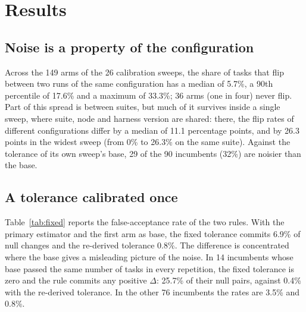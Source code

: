 
\section{Results}\label{sec:results}

\subsection{Noise is a property of the configuration}\label{sec:res-heterogeneity}
Across the 149 arms of the 26 calibration sweeps, the share of tasks that flip
between two runs of the same configuration has a median of 5.7\%, a 90th
percentile of 17.6\% and a maximum of 33.3\%; 36 arms (one in four) never flip. Part of
this spread is between suites, but much of it survives inside a single sweep,
where suite, node and harness version are shared: there, the flip rates of
different configurations differ by a median of 11.1 percentage points, and by
26.3 points in the widest sweep (from 0\% to 26.3\% on the same suite). Against the
tolerance of its own sweep's base, 29 of the 90 incumbents (32\%) are noisier than
the base.

\subsection{A tolerance calibrated once}\label{sec:res-fixed}
Table~\ref{tab:fixed} reports the false-acceptance rate of the two rules.
With the primary estimator and the first arm as base, the fixed tolerance commits
6.9\% of null changes and the re-derived tolerance 0.8\%. The difference is
concentrated where the base gives a misleading picture of the noise. In 14 incumbents whose base passed the same number of tasks in every repetition, the fixed tolerance is zero and the rule commits any positive $\Delta$: 25.7\% of their null pairs,
against 0.4\% with the re-derived tolerance. In the other 76 incumbents the rates
are 3.5\% and 0.8\%.

